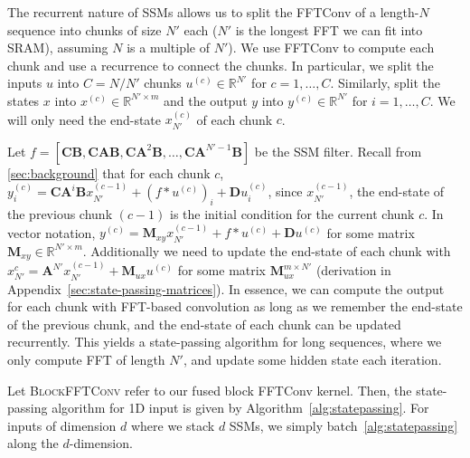 The recurrent nature of SSMs allows us to split the FFTConv of a length-$N$ sequence into chunks of size $N'$ each ($N'$ is the longest FFT we can fit into SRAM), assuming $N$ is a multiple of $N'$). We use FFTConv to compute each chunk and use a recurrence to connect the chunks. In particular, we split the inputs $u$ into $C = N/N'$ chunks $u^{(c)} \in \mathbb{R}^{N'}$ for $c=1, \dots, C$. Similarly, split the states $x$ into $x^{(c)} \in \mathbb{R}^{N' \times m}$ and the output $y$ into $y^{(c)} \in \mathbb{R}^{N'}$ for $i = 1, \dots, C$. We will only need the end-state $x_{N'}^{(c)}$ of each chunk $c$.

Let $f = [\mathbf{C} \mathbf{B}, \mathbf{C}\mathbf{A}\mathbf{B}, \mathbf{C}\mathbf{A}^2\mathbf{B}, \dots, \mathbf{C}\mathbf{A}^{N'-1}\mathbf{B}]$ be the SSM filter. Recall from \ref{sec:background} that for each chunk $c$, $y_i^{(c)} = \mathbf{C}\mathbf{A}^i\mathbf{B} x_{N'}^{(c-1)} + (f \ast u^{(c)})_i + \mathbf{D} u_i^{(c)}$, since $x_{N'}^{(c-1)}$, the end-state of the previous chunk $(c-1)$ is the initial condition for the current chunk $c$. In vector notation, $y^{(c)} = \mathbf{M}_{xy} x_{N'}^{(c-1)} + f \ast u^{(c)} + \mathbf{D} u^{(c)}$ for some matrix $\mathbf{M}_{xy} \in \mathbb{R}^{N' \times m}$. Additionally we need to update the end-state of each chunk with $x_{N'}^{c} = \mathbf{A}^{N'} x_{N'}^{(c-1)} + \mathbf{M}_{ux} u^{(c)}$ for some matrix $\mathbf{M}_{ux}^{m \times N'}$ (derivation in Appendix~\ref{sec:state-passing-matrices}).
In essence, we can compute the output for each chunk with FFT-based convolution as long as we remember the end-state of the previous chunk, and the end-state of each chunk can be updated recurrently. This yields a state-passing algorithm for long sequences, where we only compute FFT of length $N'$, and update some hidden state each iteration.

Let \textsc{BlockFFTConv} refer to our fused block FFTConv kernel. Then, the state-passing algorithm for 1D input is given by Algorithm~\ref{alg:statepassing}.
For inputs of dimension $d$ where we stack $d$ SSMs, we simply batch~\ref{alg:statepassing} along the $d$-dimension.

